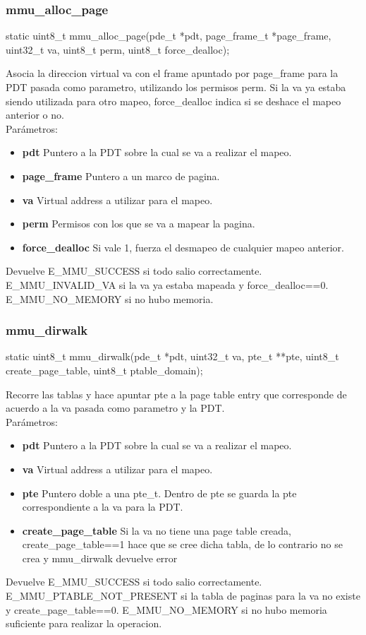 \subsubsection{mmu\_alloc\_page}
\begin{verbatimtab}
 static uint8_t mmu_alloc_page(pde_t *pdt, page_frame_t *page_frame, uint32_t va, uint8_t perm, uint8_t force_dealloc);
\end{verbatimtab}
Asocia la direccion virtual va con el frame apuntado por page\_frame para la PDT pasada como parametro, utilizando los permisos perm. 
Si la va ya estaba siendo utilizada para otro mapeo, force\_dealloc indica si se deshace el mapeo anterior o no.\\
Parámetros:
 \begin{itemize}
  \item \textbf{pdt} Puntero a la PDT sobre la cual se va a realizar el mapeo.
  \item \textbf{page\_frame} Puntero a un marco de pagina.
  \item \textbf{va} Virtual address a utilizar para el mapeo.
  \item \textbf{perm} Permisos con los que se va a mapear la pagina.
  \item \textbf{force\_dealloc} Si vale 1, fuerza el desmapeo de cualquier mapeo anterior.
 \end{itemize}
Devuelve E\_MMU\_SUCCESS si todo salio correctamente. E\_MMU\_INVALID\_VA si la va ya estaba mapeada y force\_dealloc==0. E\_MMU\_NO\_MEMORY si no hubo memoria.

\subsubsection{mmu\_dirwalk}
\begin{verbatimtab}
 static uint8_t mmu_dirwalk(pde_t *pdt, uint32_t va, pte_t **pte, uint8_t create_page_table, uint8_t ptable_domain);
\end{verbatimtab}
Recorre las tablas y hace apuntar pte a la page table entry que corresponde de acuerdo a la va pasada como parametro y la PDT. \\
Parámetros:
\begin{itemize}
  \item \textbf{pdt} Puntero a la PDT sobre la cual se va a realizar el mapeo.
  \item \textbf{va} Virtual address a utilizar para el mapeo.
  \item \textbf{pte} Puntero doble a una pte\_t. Dentro de pte se guarda la pte correspondiente a la va para la PDT.
  \item \textbf{create\_page\_table} Si la va no tiene una page table creada, create\_page\_table==1 hace que se cree dicha tabla, de lo contrario no se crea y mmu\_dirwalk devuelve error
\end{itemize}
Devuelve E\_MMU\_SUCCESS si todo salio correctamente. E\_MMU\_PTABLE\_NOT\_PRESENT si la tabla de paginas para la va no existe y create\_page\_table==0. 
 E\_MMU\_NO\_MEMORY si no hubo memoria suficiente para realizar la operacion. 


